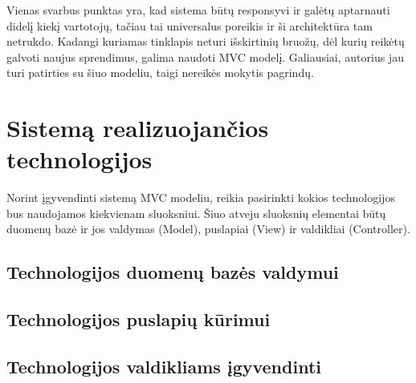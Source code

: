 \documentclass{VUMIFPSkursinis}
\begin{document}
Vienas svarbus punktas yra, kad sistema būtų responsyvi ir galėtų aptarnauti didelį kiekį vartotojų, tačiau tai universalus poreikis ir ši architektūra tam netrukdo. Kadangi kuriamas tinklapis neturi išskirtinių bruožų, dėl kurių reikėtų galvoti naujus sprendimus, galima naudoti MVC modelį\cite{MVCSO1, MVCSO2}. Galiausiai, autorius jau turi patirties su šiuo modeliu, taigi nereikės mokytis pagrindų.

\section{Sistemą realizuojančios technologijos}
Norint įgyvendinti sistemą MVC modeliu, reikia pasirinkti kokios technologijos bus naudojamos kiekvienam sluoksniui. Šiuo atveju sluoksnių elementai būtų duomenų bazė ir jos valdymas (Model), puslapiai (View) ir valdikliai (Controller).

\subsection{Technologijos duomenų bazės valdymui}



\subsection{Technologijos puslapių kūrimui}

\subsection{Technologijos valdikliams įgyvendinti}



\end{document}
